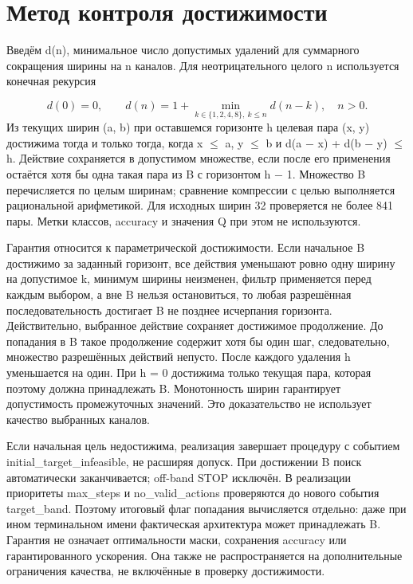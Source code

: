 \documentclass[10pt,a4paper]{article}
\begin{document}
\section*{Метод контроля достижимости}
Введём d(n), минимальное число допустимых удалений для суммарного сокращения ширины на n каналов. Для неотрицательного целого n используется конечная рекурсия

\begin{equation}
d(0)=0,\qquad d(n)=1+\min_{k\in\{1,2,4,8\},\ k\leq n}d(n-k),\quad n>0.
\end{equation}
Из текущих ширин (a, b) при оставшемся горизонте h целевая пара (x, y) достижима тогда и только тогда, когда x $\leq$ a, y $\leq$ b и d(a $-$ x) + d(b $-$ y) $\leq$ h. Действие сохраняется в допустимом множестве, если после его применения остаётся хотя бы одна такая пара из B с горизонтом h $-$ 1. Множество B перечисляется по целым ширинам; сравнение компрессии с целью выполняется рациональной арифметикой. Для исходных ширин 32 проверяется не более 841 пары. Метки классов, accuracy и значения Q при этом не используются.

Гарантия относится к параметрической достижимости. Если начальное B достижимо за заданный горизонт, все действия уменьшают ровно одну ширину на допустимое k, минимум ширины неизменен, фильтр применяется перед каждым выбором, а вне B нельзя остановиться, то любая разрешённая последовательность достигает B не позднее исчерпания горизонта. Действительно, выбранное действие сохраняет достижимое продолжение. До попадания в B такое продолжение содержит хотя бы один шаг, следовательно, множество разрешённых действий непусто. После каждого удаления h уменьшается на один. При h = 0 достижима только текущая пара, которая поэтому должна принадлежать B. Монотонность ширин гарантирует допустимость промежуточных значений. Это доказательство не использует качество выбранных каналов.

Если начальная цель недостижима, реализация завершает процедуру с событием initial\_target\_infeasible, не расширяя допуск. При достижении B поиск автоматически заканчивается; off-band STOP исключён. В реализации приоритеты max\_steps и no\_valid\_actions проверяются до нового события target\_band. Поэтому итоговый флаг попадания вычисляется отдельно: даже при ином терминальном имени фактическая архитектура может принадлежать B. Гарантия не означает оптимальности маски, сохранения accuracy или гарантированного ускорения. Она также не распространяется на дополнительные ограничения качества, не включённые в проверку достижимости.
\end{document}
